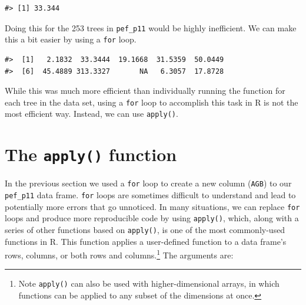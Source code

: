 \documentclass[
  11pt,
]{krantz}
\newenvironment{Shaded}{\begin{snugshade}}{\end{snugshade}}
\newcommand{\ControlFlowTok}[1]{\textcolor[rgb]{0.13,0.29,0.53}{\textbf{#1}}}
\newcommand{\DecValTok}[1]{\textcolor[rgb]{0.00,0.00,0.81}{#1}}
\newcommand{\KeywordTok}[1]{\textcolor[rgb]{0.13,0.29,0.53}{\textbf{#1}}}
\newcommand{\NormalTok}[1]{#1}
\newcommand{\OperatorTok}[1]{\textcolor[rgb]{0.81,0.36,0.00}{\textbf{#1}}}
\newcommand{\OtherTok}[1]{\textcolor[rgb]{0.56,0.35,0.01}{#1}}
\newcommand{\StringTok}[1]{\textcolor[rgb]{0.31,0.60,0.02}{#1}}
\theoremstyle{definition}
\theoremstyle{definition}
\theoremstyle{definition}
\theoremstyle{definition}
\theoremstyle{remark}
\begin{document}
\begin{verbatim}
#> [1] 33.344
\end{verbatim}

Doing this for the 253 trees in \texttt{pef\_p11} would be highly inefficient. We can make this a bit easier by using a \texttt{for} loop.

\begin{Shaded}
\end{Shaded}

\begin{verbatim}
#>  [1]   2.1832  33.3444  19.1668  31.5359  50.0449
#>  [6]  45.4889 313.3327       NA   6.3057  17.8728
\end{verbatim}

While this was much more efficient than individually running the function for each tree in the data set, using a \texttt{for} loop to accomplish this task in R is not the most efficient way. Instead, we can use \texttt{apply()}.

\hypertarget{apply}{%
\section{\texorpdfstring{The \texttt{apply()} function}{The apply() function}}\label{apply}}

In the previous section we used a \texttt{for} loop to create a new column (\texttt{AGB}) to our \texttt{pef\_p11} data frame. \texttt{for} loops are sometimes difficult to understand and lead to potentially more errors that go unnoticed. In many situations, we can replace \texttt{for} loops and produce more reproducible code by using \texttt{apply()}, which, along with a series of other functions based on \texttt{apply()}, is one of the most commonly-used functions in R. This function applies a user-defined function to a data frame's rows, columns, or both rows and columns.\footnote{Note \texttt{apply()} can also be used with higher-dimensional arrays, in which functions can be applied to any subset of the dimensions at once.} The arguments are:
\end{document}
